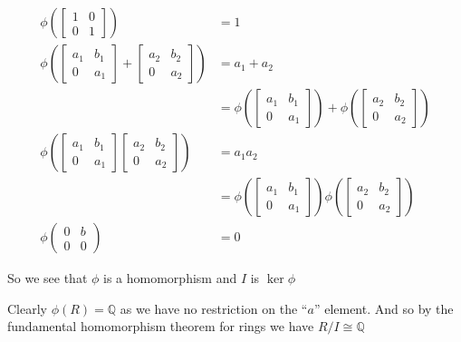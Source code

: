 \documentclass[letterpaper]{article}
\begin{document}
\begin{enumerate}
\begin{enumerate}
\begin{enumerate}
    \begin{align*}
      \phi\left(\left[\begin{array}{cc}1&0\\0&1\end{array}\right]\right)&=1\\
      \phi\left(\left[\begin{array}{cc}a_1&b_1\\0&a_1\end{array}\right]+\left[\begin{array}{cc}a_2&b_2\\0&a_2\end{array}\right]\right)&=a_1+a_2\\
      &=\phi\left(\left[\begin{array}{cc}a_1&b_1\\0&a_1\end{array}\right]\right)+\phi\left(\left[\begin{array}{cc}a_2&b_2\\0&a_2\end{array}\right]\right)\\
      \phi\left(\left[\begin{array}{cc}a_1&b_1\\0&a_1\end{array}\right]
      \left[\begin{array}{cc}a_2&b_2\\0&a_2\end{array}\right]\right)
      &=a_1a_2\\
      &=\phi\left(\left[\begin{array}{cc}a_1&b_1\\0&a_1\end{array}\right]\right)
      \phi\left(\left[\begin{array}{cc}a_2&b_2\\0&a_2\end{array}\right]\right)\\
      \phi\left(\begin{array}{cc}0&b\\0&0\end{array}\right)&=0
    \end{align*}

    So we see that $\phi$ is a homomorphism and $I$ is $\ker\phi$

    Clearly $\phi(R)=\mathbb{Q}$ as we have no restriction on the ``$a$'' element. And so by the fundamental homomorphism theorem for rings we have $R/I\cong\mathbb{Q}$
    \end{enumerate}
  \end{enumerate}
\end{enumerate}
\end{document}
